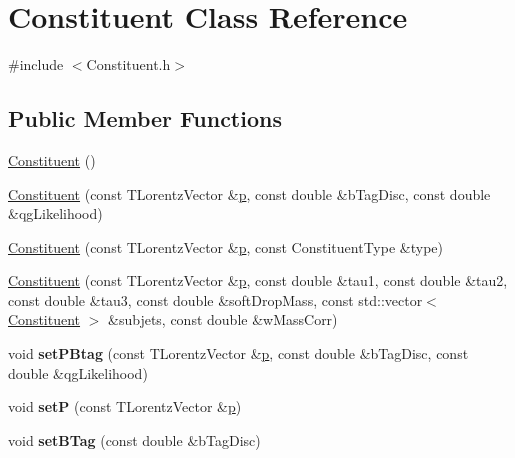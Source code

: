 \hypertarget{classConstituent}{\section{Constituent Class Reference}
\label{classConstituent}
}


{\ttfamily \#include $<$Constituent.\-h$>$}

\subsection*{Public Member Functions}
\begin{DoxyCompactItemize}
\item 
\hyperlink{classConstituent_a70507cdd41d24d156a07bb9409bc95cf}{Constituent} ()
\item 
\hyperlink{classConstituent_a86026ceffb0b81b7f1b306474325789b}{Constituent} (const T\-Lorentz\-Vector \&\hyperlink{classConstituent_a3f918f1210cc666288327544e32d728c}{p}, const double \&b\-Tag\-Disc, const double \&qg\-Likelihood)
\item 
\hyperlink{classConstituent_a812c45810832e1098b6d21c6050c123a}{Constituent} (const T\-Lorentz\-Vector \&\hyperlink{classConstituent_a3f918f1210cc666288327544e32d728c}{p}, const Constituent\-Type \&type)
\item 
\hyperlink{classConstituent_aea65c8ccaa87cd41431adeabdd667c7b}{Constituent} (const T\-Lorentz\-Vector \&\hyperlink{classConstituent_a3f918f1210cc666288327544e32d728c}{p}, const double \&tau1, const double \&tau2, const double \&tau3, const double \&soft\-Drop\-Mass, const std\-::vector$<$ \hyperlink{classConstituent}{Constituent} $>$ \&subjets, const double \&w\-Mass\-Corr)
\item 
\hypertarget{classConstituent_a5282e40233ba506ee9a1e8a5c423ecd3}{void {\bfseries set\-P\-Btag} (const T\-Lorentz\-Vector \&\hyperlink{classConstituent_a3f918f1210cc666288327544e32d728c}{p}, const double \&b\-Tag\-Disc, const double \&qg\-Likelihood)}\label{classConstituent_a5282e40233ba506ee9a1e8a5c423ecd3}

\item 
\hypertarget{classConstituent_a047ea32763c043302815face1f3aef35}{void {\bfseries set\-P} (const T\-Lorentz\-Vector \&\hyperlink{classConstituent_a3f918f1210cc666288327544e32d728c}{p})}\label{classConstituent_a047ea32763c043302815face1f3aef35}

\item 
\hypertarget{classConstituent_ad3e78cbae563a423c7d31aa5d9ca4a30}{void {\bfseries set\-B\-Tag} (const double \&b\-Tag\-Disc)}\label{classConstituent_ad3e78cbae563a423c7d31aa5d9ca4a30}


\end{DoxyCompactItemize}
